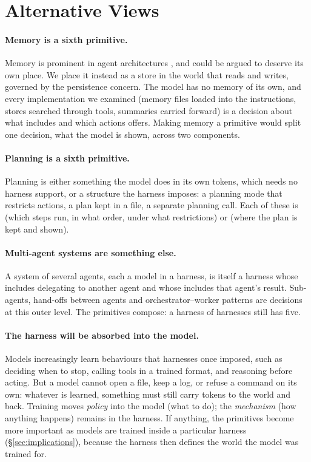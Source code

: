 \section{Alternative Views}
\label{sec:alternatives}

\paragraph{Memory is a sixth primitive.} Memory is prominent in agent architectures \citep{sumers2024coala,packer2023memgpt}, and could be argued to deserve its own place. We place it instead as a store in the world that  reads and  writes, governed by the persistence concern. The model has no memory of its own, and every implementation we examined (memory files loaded into the instructions, stores searched through tools, summaries carried forward) is a decision about what  includes and which actions  offers. Making memory a primitive would split one decision, what the model is shown, across two components.

\paragraph{Planning is a sixth primitive.} Planning is either something the model does in its own tokens, which needs no harness support, or a structure the harness imposes: a planning mode that restricts actions, a plan kept in a file, a separate planning call. Each of these is  (which steps run, in what order, under what restrictions) or  (where the plan is kept and shown).

\paragraph{Multi-agent systems are something else.} A system of several agents, each a model in a harness, is itself a harness whose  includes delegating to another agent and whose  includes that agent's result. Sub-agents, hand-offs between agents and orchestrator--worker patterns are  decisions at this outer level. The primitives compose: a harness of harnesses still has five.

\paragraph{The harness will be absorbed into the model.} Models increasingly learn behaviours that harnesses once imposed, such as deciding when to stop, calling tools in a trained format, and reasoning before acting. But a model cannot open a file, keep a log, or refuse a command on its own: whatever is learned, something must still carry tokens to the world and back. Training moves \emph{policy} into the model (what to do); the \emph{mechanism} (how anything happens) remains in the harness. If anything, the primitives become more important as models are trained inside a particular harness (\S\ref{sec:implications}), because the harness then defines the world the model was trained for.

